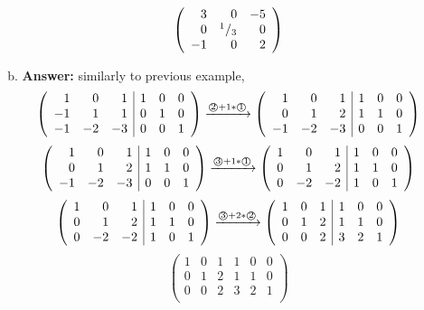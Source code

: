 \documentclass[8pt]{article} %
\begin{document}
\begin{enumerate}[1]
\begin{enumerate}[(a)]
\[\left(\begin{array}{rrr}
3&0&-5\\
0&{^{1}/_{3}}&0\\
-1&0&2\\
\end{array}\right)
\]
			\setcounter{enumi}{7}
		\item {\bf Answer: }similarly to previous example,
\[\left(\begin{array}{rrr|rrr}
1&0&1&1&0&0\\
-1&1&1&0&1&0\\
-1&-2&-3&0&0&1\\
\end{array}\right)
\xrightarrow{\text{\textcircled{2}$+1*$\textcircled{1}}}\left(\begin{array}{rrr|rrr}
1&0&1&1&0&0\\
0&1&2&1&1&0\\
-1&-2&-3&0&0&1\\
\end{array}\right)
\]\[\left(\begin{array}{rrr|rrr}
1&0&1&1&0&0\\
0&1&2&1&1&0\\
-1&-2&-3&0&0&1\\
\end{array}\right)
\xrightarrow{\text{\textcircled{3}$+1*$\textcircled{1}}}\left(\begin{array}{rrr|rrr}
1&0&1&1&0&0\\
0&1&2&1&1&0\\
0&-2&-2&1&0&1\\
\end{array}\right)
\]\[\left(\begin{array}{rrr|rrr}
1&0&1&1&0&0\\
0&1&2&1&1&0\\
0&-2&-2&1&0&1\\
\end{array}\right)
\xrightarrow{\text{\textcircled{3}$+2*$\textcircled{2}}}\left(\begin{array}{rrr|rrr}
1&0&1&1&0&0\\
0&1&2&1&1&0\\
0&0&2&3&2&1\\
\end{array}\right)
\]\[\left(\begin{array}{rrr|rrr}
1&0&1&1&0&0\\
0&1&2&1&1&0\\
0&0&2&3&2&1\\
\end{array}\right)
\]
\end{enumerate}
\end{enumerate}
\end{document}
